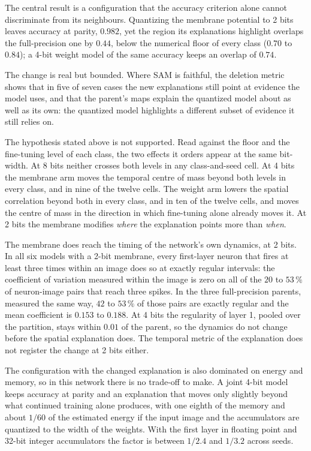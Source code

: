 The central result is a configuration that the accuracy criterion alone cannot discriminate
from its neighbours. Quantizing the membrane potential to 2 bits leaves
accuracy at parity, $0.982$, yet the region its explanations highlight overlaps
the full-precision one by $0.44$, below the numerical floor of every class
($0.70$ to $0.84$); a 4-bit weight model of the same accuracy keeps an overlap of
$0.74$.

The change is real but bounded. Where SAM is faithful, the deletion metric shows that in
five of seven cases the new explanations still point at evidence the model
uses, and that the parent's maps explain the quantized model about as well as
its own: the quantized model highlights a different subset of evidence it still
relies on.

The hypothesis stated above is not supported. Read against the floor and the
fine-tuning level of each class, the two effects it orders appear at the same
bit-width. At 8 bits neither crosses both levels in any class-and-seed cell. At
4 bits the membrane arm moves the temporal centre of mass beyond both levels in
every class, and in nine of the twelve cells. The weight arm lowers the spatial
correlation beyond both in every class, and in ten of the twelve cells, and
moves the centre of mass in the direction in which fine-tuning alone already
moves it. At 2 bits the membrane modifies \emph{where} the explanation points
more than \emph{when}.

The membrane does reach the timing of the network's own dynamics, at 2 bits. In
all six models with a 2-bit membrane, every first-layer neuron that fires at
least three times within an image does so at exactly regular intervals: the
coefficient of variation measured within the image is zero on all of the $20$ to
$53\,\%$ of neuron-image pairs that reach three spikes. In the three
full-precision parents, measured the same way, $42$ to $53\,\%$ of those pairs
are exactly regular and the mean coefficient is $0.153$ to $0.188$. At 4 bits
the regularity of layer 1, pooled over the partition, stays within $0.01$ of the
parent, so the dynamics do not change before the spatial explanation does. The
temporal metric of the explanation does not register the change at 2 bits
either.

The configuration with the changed explanation is also dominated on energy and
memory, so in this network there is no trade-off to make. A joint 4-bit model
keeps accuracy at parity and an explanation that moves only slightly beyond what
continued training alone produces, with one eighth of the memory and about
$1/60$ of the estimated energy if the input image and the accumulators are
quantized to the width of the weights. With the first layer in floating point
and 32-bit integer accumulators the factor is between $1/2.4$ and $1/3.2$ across
seeds.

